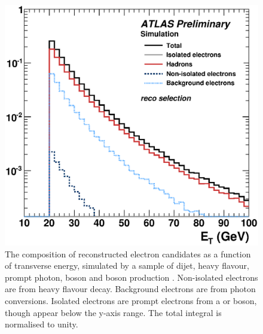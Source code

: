 \begin{figure}[t]
	\includegraphics[width=\smallfigwidth]{tex/selection/electron_composition}
	\caption{The composition of reconstructed electron candidates as a function of 
	transverse energy, simulated by a  sample of dijet, heavy flavour, prompt 
	photon, \PW boson and \PZ boson production \cite{ElectronPerf:Expect}. Non-isolated 
	electrons are from heavy flavour decay. Background electrons are from photon 
	conversions. Isolated electrons are prompt electrons from a \PW or \PZ boson, though 
	appear below the y-axis range. The total integral is normalised to unity.}
	\label{fig:objects:el_composition}
\end{figure}

